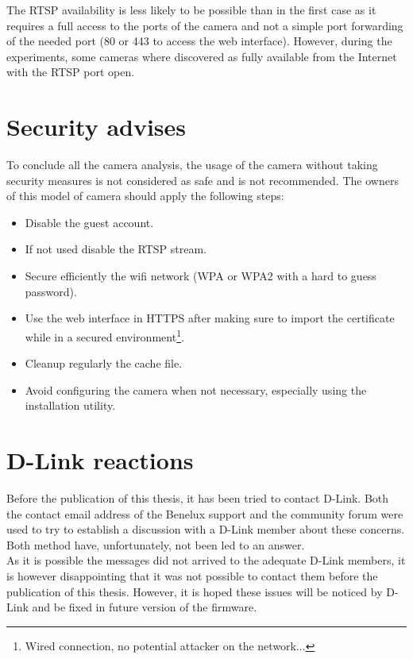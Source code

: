 The RTSP availability is less likely to be possible than in the first case as it requires a full access to the ports of the camera and not a simple port forwarding of the needed port (80 or 443 to access the web interface).
However, during the experiments, some cameras where discovered as fully available from the Internet with the RTSP port open.

\section{Security advises}
\label{sec:dcs-security}
To conclude all the camera analysis, the usage of the camera without taking security measures is not considered as safe and is not recommended.
The owners of this model of camera should apply the following steps:

\begin{itemize}
\item Disable the guest account.
\item If not used disable the RTSP stream.
\item Secure efficiently the wifi network (WPA or WPA2 with a hard to guess password).
\item Use the web interface in HTTPS after making sure to import the certificate while in a secured environment\footnote{Wired connection, no potential attacker on the network...}.
\item Cleanup regularly the cache file.
\item Avoid configuring the camera when not necessary, especially using the installation utility.
\end{itemize}

\section{D-Link reactions}
\label{sec:dcs-dlink}

Before the publication of this thesis, it has been tried to contact D-Link.
Both the contact email address of the Benelux support and the community forum were used to try to establish a discussion with a D-Link member about these concerns.
Both method have, unfortunately, not been led to an answer.\\

As it is possible the messages did not arrived to the adequate D-Link members, it is however disappointing that it was not possible to contact them before the publication of this thesis.
However, it is hoped these issues will be noticed by D-Link and be fixed in future version of the firmware.

